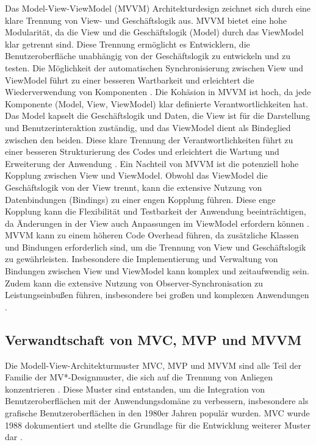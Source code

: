 Das Model-View-ViewModel (MVVM) Architekturdesign zeichnet sich durch eine klare 
Trennung von View- und Geschäftslogik aus.
MVVM bietet eine hohe Modularität, da die View und die Geschäftslogik (Model) 
durch das ViewModel klar getrennt sind. Diese Trennung ermöglicht es Entwicklern, 
die Benutzeroberfläche unabhängig von der Geschäftslogik zu entwickeln und zu 
testen. Die Möglichkeit der automatischen Synchronisierung zwischen View und 
ViewModel führt zu einer besseren Wartbarkeit und erleichtert die Wiederverwendung 
von Komponenten \cite{arcos2018comparative}.
Die Kohäsion in MVVM ist hoch, da jede Komponente (Model, View, ViewModel) klar 
definierte Verantwortlichkeiten hat. Das Model kapselt die Geschäftslogik und 
Daten, die View ist für die Darstellung und Benutzerinteraktion zuständig, und das 
ViewModel dient als Bindeglied zwischen den beiden. Diese klare Trennung der 
Verantwortlichkeiten führt zu einer besseren Strukturierung des Codes und erleichtert 
die Wartung und Erweiterung der Anwendung \cite{arcos2018comparative}.
Ein Nachteil von MVVM ist die potenziell hohe Kopplung zwischen View und 
ViewModel. Obwohl das ViewModel die Geschäftslogik von der View trennt, kann die 
extensive Nutzung von Datenbindungen (Bindings) zu einer engen Kopplung führen. 
Diese enge Kopplung kann die Flexibilität und Testbarkeit der Anwendung 
beeinträchtigen, da Änderungen in der View auch Anpassungen im ViewModel 
erfordern können \cite{arcos2018comparative}.
MVVM kann zu einem höheren Code Overhead führen, da zusätzliche Klassen und 
Bindungen erforderlich sind, um die Trennung von View und Geschäftslogik zu 
gewährleisten. Insbesondere die Implementierung und Verwaltung von Bindungen 
zwischen View und ViewModel kann komplex und zeitaufwendig sein. Zudem kann die 
extensive Nutzung von Observer-Synchronisation zu Leistungseinbußen führen, 
insbesondere bei großen und komplexen Anwendungen \cite{arcos2018comparative}.

\subsection{Verwandtschaft von MVC, MVP und MVVM}
Die Modell-View-Architekturmuster MVC, MVP und MVVM sind alle Teil der Familie der 
MV*-Designmuster, die sich auf die Trennung von Anliegen konzentrieren \cite{aihara2012mvc}. Diese 
Muster sind entstanden, um die Integration von Benutzeroberflächen mit der Anwendungsdomäne zu 
verbessern, insbesondere als grafische Benutzeroberflächen in den 1980er Jahren populär wurden. 
MVC wurde 1988 dokumentiert und stellte die Grundlage für die Entwicklung weiterer Muster dar 
\cite{aihara2012mvc}.

